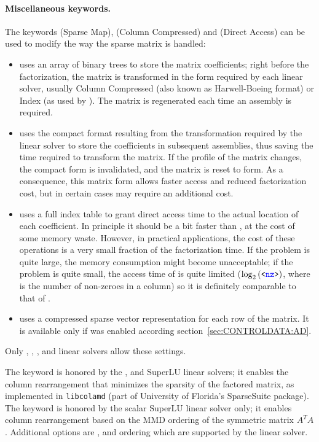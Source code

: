 \paragraph{Miscellaneous keywords.}
The keywords  (Sparse Map),  (Column Compressed)
and  (Direct Access) can be used to modify the way
the sparse matrix is handled:
\begin{itemize}
\item {} uses an array of binary trees to store the matrix
coefficients; right before the factorization, the matrix is transformed
in the form required by each linear solver, usually Column Compressed
(also known as Harwell-Boeing format) or Index (as used by ).
The matrix is regenerated each time an assembly is required.
\item {} uses the compact format resulting from the transformation
required by the linear solver to store the coefficients
in subsequent assemblies,
thus saving the time required to transform the matrix.
If the profile of the matrix changes, the compact form is invalidated,
and the matrix is reset to  form.  As a consequence, this matrix
form allows faster access and reduced factorization cost, but in certain
cases may require an additional cost.
\item {} uses a full index table to grant direct access time to
the actual location of each coefficient.
In principle it should be a bit faster than , at the cost
of some memory waste.
However, in practical applications, the cost of these operations
is a very small fraction of the factorization time.
If the problem is quite large, the memory consumption might
become unacceptable; if the problem is quite small, the access time
of  is quite limited ($\log_2\left( \texttt{<\textcolor{blue}{nz}>} \right)$, where
 is the number of non-zeroes in a column) so it is definitely
comparable to that of .
\item {} uses a compressed sparse vector representation for each row of the matrix.
  It is available only if  was enabled according section~\ref{sec:CONTROLDATA:AD}.
\end{itemize}
Only , , ,  and 
linear solvers allow these settings.

The keyword  is honored by the ,  and SuperLU linear solvers;
it enables the column rearrangement that minimizes the sparsity
of the factored matrix, as implemented in \texttt{libcolamd}
(part of University of Florida's SparseSuite package).
The keyword  is honored by 
the scalar SuperLU linear solver only; it enables column rearrangement
based on the MMD ordering of the symmetric matrix $A^T A$.
Additional options are ,  and  ordering which are supported by the  linear solver.


